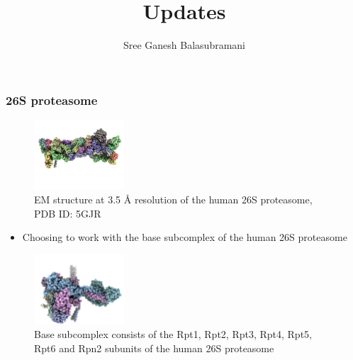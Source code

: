 \documentclass[a4paper,8pt]{beamer}
\title{Updates}
\author[]{Sree Ganesh Balasubramani}
\institute[UCSF]{Echeverria Group, UC San Francisco}
\date{}
\begin{document}
\maketitle
%
\begin{frame}
\frametitle{26S proteasome}
\begin{figure}
\centering
\includegraphics[width=0.3\textwidth]{figures/5gjr_structure.png}
\caption{EM structure at 3.5 {\AA} resolution of the human 26S proteasome, PDB ID: 5GJR}
\end{figure}
\begin{block}{}
  \begin{itemize}
    \item Choosing to work with the base subcomplex of the human 26S proteasome
  \end{itemize}
\end{block}
\begin{figure}
  \centering
  \includegraphics[width=0.3\textwidth]{figures/base_proteasome_5gjr.png}
  \caption{Base subcomplex consists of the Rpt1, Rpt2, Rpt3, Rpt4, Rpt5, Rpt6 and Rpn2 subunits
  of the human 26S proteasome}
\end{figure}
\end{frame}
\end{document}
